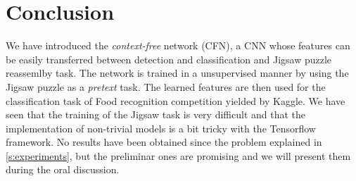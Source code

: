 \section{Conclusion}
We have introduced the \emph{context-free} network (CFN), a CNN whose features can be easily transferred between detection and classification and Jigsaw puzzle reassemlby task. The network is trained in a unsupervised manner by using the Jigsaw puzzle as a \emph{pretext} task. The learned features are then used for the classification task of Food recognition competition yielded by Kaggle. We have seen that the training of the Jigsaw task is very difficult and that the implementation of non-trivial models is a bit tricky with the Tensorflow framework. No results have been obtained since the problem explained in \ref{s:experiments}, but the preliminar ones are promising and we will present them during the oral discussion.